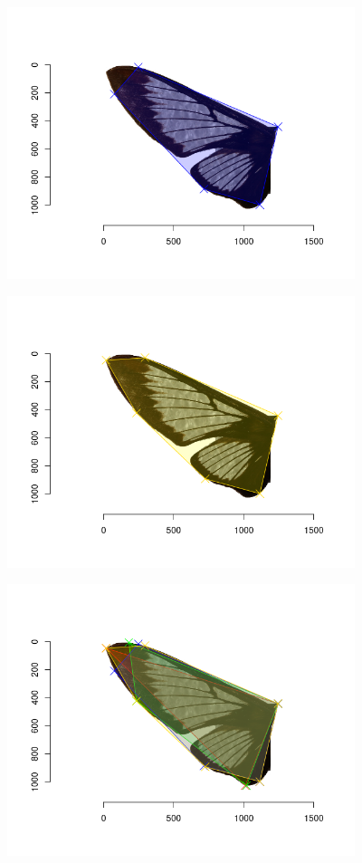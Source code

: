 \documentclass[
]{article}
\let\origfigure\figure
\let\endorigfigure\endfigure
\renewenvironment{figure}[1][2] {
    \expandafter\origfigure\expandafter[H]
} {
    \endorigfigure
}
\begin{document}
\begin{figure}
\centering
\includegraphics[width=\textwidth,height=3.125in]{./img/Areas_5_Hemaris_diffinis_left_wing.png}
\caption{Pentagon}
\end{figure}

\begin{figure}
\centering
\includegraphics[width=\textwidth,height=3.125in]{./img/Areas_6_Hemaris_diffinis_left_wing.png}
\caption{Hexagon}
\end{figure}

\begin{figure}
\centering
\includegraphics[width=\textwidth,height=3.125in]{./img/Areas_3_4_5_6_Hemaris_diffinis_left_wing.png}
\caption{Superposition of polygons}
\end{figure}
\end{document}
